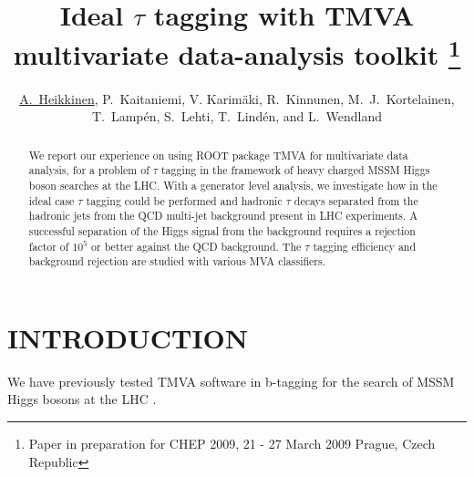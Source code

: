 \documentclass[twoside,floatfix,a4wide]{revtex4}
\begin{document}
\title{Ideal $\tau$ tagging with TMVA multivariate data-analysis toolkit
\footnote{Paper \cite{ah09bProceedings} in preparation for CHEP 2009, 21 - 27 March 2009 Prague, 
Czech Republic}}

\author{\underline{A.~Heikkinen}, P.~Kaitaniemi, V. Karim\"{a}ki,
 R.~Kinnunen,  M.~J.~Kortelainen, T.~Lamp\'{e}n, S.~Lehti, T.~Lind\'{e}n, and L.~Wendland} 

\begin{abstract}
We report our experience on using ROOT package TMVA for
multivariate data analysis, for a problem of $\tau$ tagging in the
framework of heavy charged MSSM Higgs boson searches at the LHC.
With a generator level analysis, 
we investigate how in the ideal case $\tau$ tagging could be performed and 
hadronic $\tau$ decays separated from the
hadronic jets from the QCD multi-jet background present in LHC experiments. 
A successful separation of the Higgs signal from the background 
requires a rejection factor of $10^5$ or better against the QCD background. 
The $\tau$ tagging efficiency and background rejection are studied with various MVA classifiers.


\end{abstract}

\maketitle

\thispagestyle{fancy}

\section{INTRODUCTION \label{section:intro}}
We have previously tested TMVA software in b-tagging for the search of MSSM Higgs bosons 
at the LHC \cite{heikkinen07lProceedings}.
\end{document}
